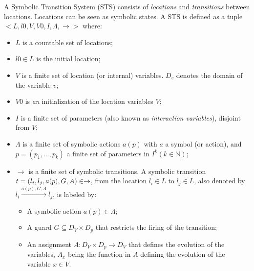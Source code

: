 \begin{definition}
    A Symbolic Transition System (STS) consists of
    \emph{locations} and \emph{transitions} between locations.
    Locations can be seen as symbolic states.
    A STS is defined as a tuple
    $<L,l0,V,V0,I,\Lambda,\rightarrow>$ where:

    \begin{itemize}
        \item $L$ is a countable set of locations;

        \item $l0 \in L$ is the initial location;

        \item $V$ is a finite set of location (or internal)
            variables. $D_v$ denotes the domain of the
            variable $v$;

        \item $V0$ is \emph{an} initialization of the location
            variables $V$;

        \item $I$ is a finite set of parameters (also known as
            \emph{interaction variables}), disjoint from $V$;

        \item $\Lambda$ is a finite set of symbolic actions
            $a(p)$ with $a$ a symbol (or action), and
            $p=(p_1,\dots ,p_k)$ a finite set of parameters in
            $I^{k} (k \in \mathbb{N})$;

        \item $\rightarrow$ is a finite set of symbolic
            transitions. A symbolic transition $t =
            (l_i,l_j,a(p),G,\\A) \in \rightarrow$, from the
            location $l_i \in L$ to $l_j \in L$, also denoted by
            $l_i \xrightarrow{a(p),G,A} l_j$, is labeled by:

        \begin{itemize}
            \item A symbolic action $a(p) \in \Lambda$;

            \item A guard $G \subseteq D_V \times D_p$ that
            restricts the firing of the transition;

            \item An assignment $A : D_V \times D_p \rightarrow
            D_V$ that defines the evolution of the variables,
            $A_x$ being the function in $A$ defining the
            evolution of the variable $x \in V$.
		\end{itemize}
	\end{itemize}

	\label{def:sts-orig}
\end{definition}

